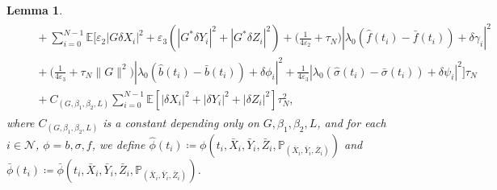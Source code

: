 \documentclass[11pt]{article}
\numberwithin{equation}{section}
\newtheorem{Lemma}[Theorem]{Lemma}
\theoremstyle{definition}
\theoremstyle{remark}
\def\b{\beta}  \def\a{\alpha} \def\ga{\gamma}
\def\eps{\varepsilon}
\def\cN{\mathcal{N}}
\def\sE{{\mathbb{E}}}
\def\sP{\mathbb{P}}
\begin{document}
\begin{Lemma}
\begin{align*}
\begin{split}
&\quad
 +\sum_{i=0}^{N-1}
 \sE\bigg[
\eps_2 | G \delta X_i|^2+\eps_3 (|G^*\delta Y_{i}|^2+| G^*\delta  {Z}_i|^2)
+
\bigg(
\frac{1}{4\eps_2}
+\tau_N
\bigg)
|
\lambda _0
(\hat{f}(t_{i})-\bar{f}(t_{i}))+\delta \gamma_i|^2
\\
&\quad
+
\bigg(
\frac{1}{4\eps_3}
+\tau_N\|G\|^2 \bigg)
 |
 \lambda_0(
 \hat{b}(t_{i})-\bar{b}(t_{i}))+\delta \phi_{i}|^2
+
\frac{1}{4\eps_3}
 | 
 \lambda_0( \hat{\sigma}(t_i)-\bar{\sigma}(t_i))+\delta \psi_{i}|^2
 \bigg]\tau_N
 \\
 &\quad
 +C_{(G,\b_1,\b_2, L)}\sum_{i=0}^{N-1}
 \sE[|  \delta X_i|^2+|\delta Y_{i}|^2+| \delta  {Z}_i|^2]\tau^2_N,
\end{split}
\end{align*}
  where 
 $C_{(G,\b_1,\b_2, L)}$ is  a constant depending  only on $G,\b_1,\b_2, L$,
 and
for each $i\in \cN$, $\phi=b, \sigma, f$,
we define
 $\hat{\phi}(t_i)\coloneqq \phi(t_i, \bar{X}_i, \bar{Y}_i, \bar{Z}_i,\sP_{(\bar{X}_i, \bar{Y}_i, \bar{Z}_i)})$
 and
$\bar{\phi}(t_i)\coloneqq \bar{\phi}(t_i, \bar{X}_i, \bar{Y}_i, \bar{Z}_i,\sP_{(\bar{X}_i, \bar{Y}_i, \bar{Z}_i)})$.

\end{Lemma}
\end{document}
